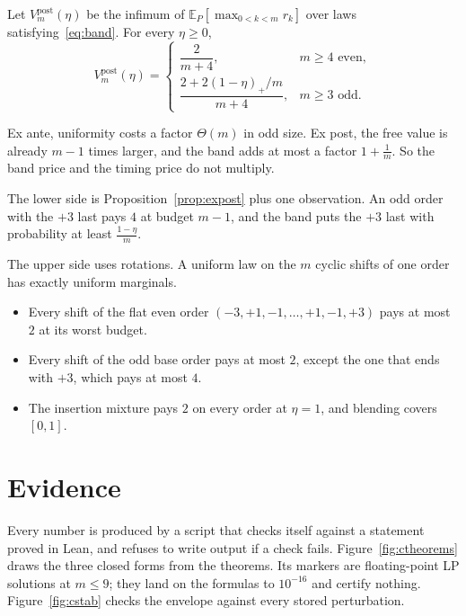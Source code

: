 \begin{theorem}
\label{thm:expostband}
Let $V^{\mathrm{post}}_{m}(\eta)$ be the infimum of $\mathbb{E}_{P}[\max_{0<k<m}r_{k}]$ over laws
satisfying~\eqref{eq:band}. For every $\eta\ge0$,
\[
V^{\mathrm{post}}_{m}(\eta)=
\begin{cases}
\dfrac{2}{m+4}, & m\ge4\text{ even},\\[8pt]
\dfrac{2+2(1-\eta)_{+}/m}{m+4}, & m\ge3\text{ odd}.
\end{cases}
\]
\end{theorem}


Ex ante, uniformity costs a factor $\Theta(m)$ in odd size. Ex post, the free value is
already $m-1$ times larger, and the band adds at most a factor $1+\frac1m$. So the band price
and the timing price do not multiply.

The lower side is Proposition~\ref{prop:expost} plus one observation. An odd order with the
$+3$ last pays $4$ at budget $m-1$, and the band puts the $+3$ last with probability at least
$\frac{1-\eta}{m}$.

The upper side uses rotations. A uniform law on the $m$ cyclic shifts of one order has exactly
uniform marginals.
\begin{itemize}
\item Every shift of the flat even order $(-3,+1,-1,\dots,+1,-1,+3)$ pays at most $2$ at its
worst budget.
\item Every shift of the odd base order pays at most $2$, except the one that ends with $+3$,
which pays at most $4$.
\item The insertion mixture pays $2$ on every order at $\eta=1$, and blending covers $[0,1]$.
\end{itemize}

\section{Evidence}
\label{sec:evidence}

Every number is produced by a script that checks itself against a statement proved in Lean,
and refuses to write output if a check fails. Figure~\ref{fig:ctheorems} draws the three
closed forms from the theorems. Its markers are floating-point LP solutions at $m\le9$; they
land on the formulas to $10^{-16}$ and certify nothing. Figure~\ref{fig:cstab} checks the
envelope against every stored perturbation.

